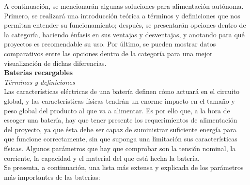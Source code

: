 \documentclass[12pt]{article}
\begin{document}
	\noindent A continuación, se mencionarán algunas soluciones para alimentación autónoma. Primero, se realizará una introducción teórica a términos y definiciones que nos permitan entender su funcionamiento; después, se presentarán opciones dentro de la categoría, haciendo énfasis en sus ventajas y desventajas, y anotando para qué proyectos es recomendable su uso. Por último, se pueden mostrar datos comparativos entre las opciones dentro de la categoría para una mejor visualización de dichas diferencias.\\ 
	
	\noindent \textbf{Baterías recargables} \\
	
	\noindent \textit{Términos y definiciones} \\
	
	\noindent Las características eléctricas de una batería definen cómo actuará en el circuito global, y las características físicas tendrán un enorme impacto en el tamaño y peso global del producto al que va a alimentar. Es por ello que, a la hora de escoger una batería, hay que tener presente los requerimientos de alimentación del proyecto, ya que ésta debe ser capaz de suministrar suficiente energía para que funcione correctamente, sin que suponga una limitación sus características físicas. Algunos parámetros que hay que comprobar son la tensión nominal, la corriente, la capacidad y el material del que está hecha la batería. \\
	
	\noindent Se presenta, a continuación, una lista más extensa y explicada de los parámetros más importantes de las baterías: 
	
\end{document}

